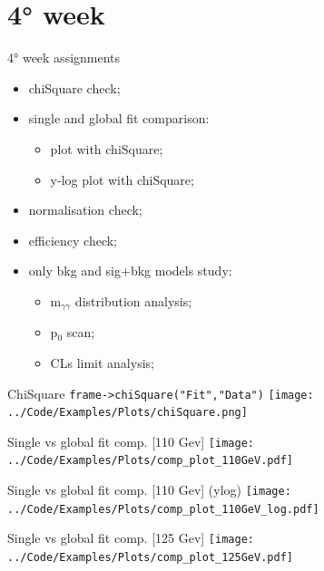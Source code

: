 \documentclass[10pt,UKenglish, leqno, xcolor = dvipsnames]{beamer}
\begin{document}
	\section{4° week}
	\SectionPage
	
		\begin{frame}{4° week assignments}
			\vfill
			\begin{itemize}
				\item chiSquare check;
				\item single and global fit comparison:
				\begin{itemize}
					\item plot with chiSquare;
					\item y-log plot with chiSquare; 
				\end{itemize}
				\item normalisation check;
				\item efficiency check;
				\item only bkg and sig+bkg models study:
				\begin{itemize}
					\item m$_{\gamma\gamma}$ distribution analysis;
					\item p$_0$ scan;
					\item CLs limit analysis;
				\end{itemize}
			\end{itemize}
			\vfill
		\end{frame}
	
		\begin{frame}{ChiSquare}
			\vfill
			\centering
			\texttt{frame->chiSquare("Fit","Data")}
			\texttt{[image: ../Code/Examples/Plots/chiSquare.png]}
			\vfill
		\end{frame}
	
		\begin{frame}{Single vs global fit comp. [110 Gev]}
			\vfill
			\texttt{[image: ../Code/Examples/Plots/comp\_plot\_110GeV.pdf]}
			\vfill
		\end{frame}
	
		\begin{frame}{Single vs global fit comp. [110 Gev] (ylog)}
			\vfill
			\texttt{[image: ../Code/Examples/Plots/comp\_plot\_110GeV\_log.pdf]}
			\vfill
		\end{frame}
	
		\begin{frame}{Single vs global fit comp. [125 Gev]}
			\vfill
			\texttt{[image: ../Code/Examples/Plots/comp\_plot\_125GeV.pdf]}
			\vfill
		\end{frame}
		
\end{document}
